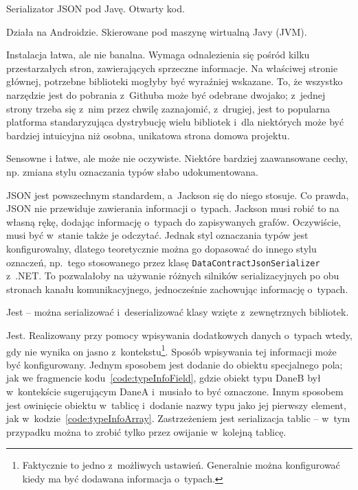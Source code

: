 \begin{description}
Serializator JSON pod Javę. Otwarty kod.

Działa na Androidzie. Skierowane pod maszynę wirtualną Javy (JVM).

Instalacja łatwa, ale nie banalna.
Wymaga odnalezienia się pośród kilku przestarzałych stron, zawierających sprzeczne informacje.
Na właściwej stronie głównej, potrzebne biblioteki mogłyby być wyraźniej wskazane.
To, że wszystko narzędzie jest do pobrania z~Githuba może być odebrane dwojako; z~jednej strony trzeba się z~nim przez chwilę zaznajomić, z~drugiej, jest to popularna platforma standaryzująca dystrybucję wielu bibliotek i~dla niektórych może być bardziej intuicyjna niż osobna, unikatowa strona domowa projektu.

Sensowne i łatwe, ale może nie oczywiste. Niektóre bardziej zaawansowane cechy, np. zmiana stylu oznaczania typów słabo udokumentowana.

JSON jest powszechnym standardem, a~Jackson się do niego stosuje.
Co prawda, JSON nie przewiduje zawierania informacji o~typach.
Jackson musi robić to na własną rękę, dodając informację o~typach do zapisywanych grafów. Oczywiście, musi być w~stanie także je odczytać.
Jednak styl oznaczania typów jest konfigurowalny, dlatego teoretycznie można go dopasować do innego stylu oznaczeń, np.\ tego stosowanego przez klasę \texttt{DataContractJsonSerializer} z~.NET\@.
To pozwalałoby na używanie różnych silników serializacyjnych po obu stronach kanału komunikacyjnego, jednocześnie zachowując informację o~typach.

Jest -- można serializować i~deserializować klasy wzięte z~zewnętrznych bibliotek.

Jest. Realizowany przy pomocy wpisywania dodatkowych danych o~typach wtedy, gdy nie wynika on jasno z~kontekstu\footnote{Faktycznie to jedno z~możliwych ustawień. Generalnie można konfigurować kiedy ma być dodawana informacja o~typach.}.
Sposób wpisywania tej informacji może być konfigurowany.
Jednym sposobem jest dodanie do obiektu specjalnego pola; jak we fragmencie kodu~\ref{code:typeInfoField}, gdzie obiekt typu DaneB był w~kontekście sugerującym DaneA i~musiało to być oznaczone.
Innym sposobem jest owinięcie obiektu w~tablicę i~dodanie nazwy typu jako jej pierwszy element, jak w~kodzie~\ref{code:typeInfoArray}.
Zastrzeżeniem jest serializacja tablic -- w~tym przypadku można to zrobić tylko przez owijanie w~kolejną tablicę.


\end{description}
